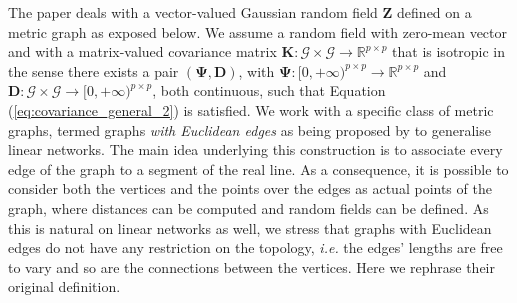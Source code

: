 \documentclass[12pt]{article}
\theoremstyle{plain}
\theoremstyle{remark}
\newcommand{\round}[1]{\left( #1 \right)}
\newcommand{\R}[0]{\mathbb{R}}
\newcommand{\ie}{\textit{i.e. }}
\newcommand{\latMatr}[1]{\mathbf{#1}}          %
\newcommand{\grMatr}[1]{{\boldsymbol{#1}}}   %
\newcommand{\rVec}[1]{{\bm{#1}}}            %
\newcommand{\tobi}[1]{\textcolor{teal}{#1}}
\begin{document}
    The paper deals with a vector-valued Gaussian random field ${\rVec{Z}}$ %
     defined on a metric graph as exposed below. We assume a {random field} %
    with zero-mean vector and with a matrix-valued covariance matrix $\latMatr K: \mathcal G \times \mathcal G \to \R^{p \times p}$ that is isotropic in the sense there exists a pair $(\grMatr \Psi, \latMatr D)$, with $\grMatr \Psi: [0,+\infty)^{p \times p} \to \R^{p \times p}$ and $\latMatr D : \mathcal G \times \mathcal G \to {[0,+\infty)}^{p \times p}$, both continuous, such that Equation (\ref{eq:covariance_general_2}) is satisfied. 
    We work with a specific class of metric graphs, termed graphs 
     {\em with Euclidean edges} as being proposed by \cite{anderes_isotropic_2020} to generalise linear networks. The main idea underlying this construction is to associate every edge of the graph to a segment of the real line. As a consequence, it is possible to consider both the vertices and the points over the edges as actual points of the graph, where distances can be computed and {random fields} can be defined. As this is natural on linear networks as well, we stress that graphs with Euclidean edges do not have any restriction on the topology, \ie the edges' lengths are free to vary and so are the connections between the vertices. Here we rephrase their original definition.
\end{document}
